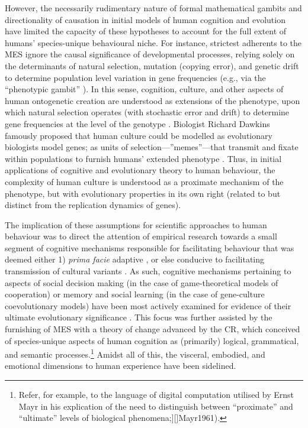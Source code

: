 \begin{CJK}{UTF8}{gbsn}
However, the necessarily rudimentary nature of formal mathematical gambits and directionality of causation in initial models of human cognition and evolution have limited the capacity of these hypotheses to account for the full extent of humans' species-unique behavioural niche.  For instance, strictest adherents to the MES ignore the causal significance of developmental processes, relying solely on the determinants of natural selection, mutation (copying error), and genetic drift to determine population level variation in gene frequencies (e.g., via the ``phenotypic gambit'' \citep{Grafen1984,Grafen1991}).  In this sense, cognition, culture, and other aspects of human ontogenetic creation are understood as extensions of the phenotype, upon which natural selection operates (with stochastic error and drift) to determine gene frequencies at the level of the genotype \citep{Dawkins1982}.  Biologist Richard Dawkins famously proposed that human culture could be modelled as evolutionary biologists model genes; as units of selection---''memes''---that transmit and fixate within populations to furnish humans' extended phenotype \citep{Dawkins1976}.  Thus, in initial applications of cognitive and evolutionary theory to human behaviour, the complexity of human culture is understood as a proximate mechanism of the phenotype, but with evolutionary properties in its own right (related to but distinct from the replication dynamics of genes).

The implication of these assumptions for scientific approaches to human behaviour was to direct the attention of empirical research  towards a small segment of cognitive mechanisms responsible for facilitating behaviour that was deemed either 1) \textit{prima facie} adaptive \citep[an approach that has since matured into the field of  evolutionary psychology, see][]{Cosmides1992}, or else conducive to facilitating transmission of cultural variants \citep[an approach that has since matured into the field of cultural evolution][]{Cavalli-Sforza1981,Boyd1988}.  As such, cognitive mechanisms pertaining to aspects of social decision making (in the case of game-theoretical models of cooperation) or memory and social learning (in the case of gene-culture coevolutionary models) have been most actively examined for evidence of their ultimate evolutionary significance \citep{Fuentes2016}.  This focus was further assisted by the furnishing of MES with a theory of change advanced by the CR, which conceived of species-unique aspects of human cognition as (primarily) logical, grammatical, and semantic processes.\footnote{Refer, for example, to the language of digital computation utilised by Ernst Mayr in his explication of the need to distinguish between ``proximate'' and ``ultimate'' levels of biological phenomena;][]{Mayr1961}).} Amidst all of this, the visceral, embodied, and emotional dimensions to human experience have been sidelined.


\end{CJK}
